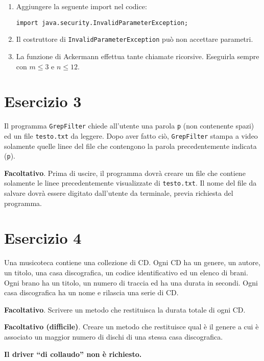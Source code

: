 \documentclass[]{scrartcl}
\begin{document}
\begin{enumerate}
\item Aggiungere la seguente import nel codice: 
\begin{verbatim}
import java.security.InvalidParameterException;
\end{verbatim}
\item Il costruttore di \texttt{InvalidParameterException} può non accettare parametri.
\item La funzione di Ackermann  effettua tante chiamate ricorsive. Eseguirla sempre con $m\leq 3$ e $n\leq 12$.
\end{enumerate}

\section*{Esercizio 3}
Il programma \texttt{GrepFilter} chiede all'utente una parola \texttt{p} (non contenente spazi) ed un file \texttt{testo.txt} da leggere. Dopo aver fatto ciò,  \texttt{GrepFilter} stampa a video solamente quelle linee del file che contengono la parola precedentemente indicata (\texttt{p}).

\textbf{Facoltativo}. Prima di uscire, il programma dovrà creare un file che contiene solamente le linee precedentemente visualizzate di \texttt{testo.txt}. Il nome del file da salvare dovrà essere digitato dall'utente da terminale, previa richiesta del programma.

\section*{Esercizio 4}
Una musicoteca contiene una collezione di CD. Ogni CD ha un genere, un autore, un titolo, una casa discografica, un codice identificativo ed un elenco di brani. Ogni brano ha un titolo, un numero di traccia ed ha una durata in secondi. Ogni casa discografica ha un nome e rilascia una serie di CD.

\textbf{Facoltativo}. Scrivere un metodo che restituisca la durata totale di ogni CD.

\textbf{Facoltativo (difficile)}. Creare un metodo che restituisce qual è il genere a cui è associato un maggior numero di dischi di una stessa casa discografica.

\textbf{Il driver ``di collaudo'' non è richiesto.}
\end{document}
